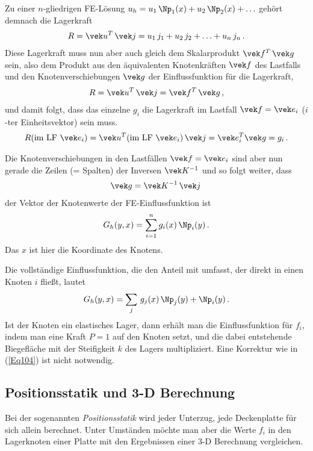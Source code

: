 {{{{{{Zu einer $n$-gliedrigen FE-L\"{o}sung $u_h = u_1\,\Np_1(x) + u_2\,\Np_2(x) + \ldots$ geh\"{o}rt demnach die Lagerkraft
\begin{align}
R = \vek u^T\,\vek j = u_1\,j_1 + u_2\,j_2 + \ldots + u_n\,j_n\,.
\end{align}
Diese Lagerkraft muss nun aber auch gleich dem Skalarprodukt $\vek f^T\,\vek g$ sein, also dem Produkt aus den \"{a}quivalenten Knotenkr\"{a}ften $\vek f$ des Lastfalls und den Knotenverschiebungen $\vek g$ der Einflussfunktion f\"{u}r die Lagerkraft,
\begin{align}
R = \vek u^T\,\vek j = \vek f^T\,\vek g\,,
\end{align}
und damit folgt, dass das einzelne $g_i$ die Lagerkraft im Lastfall $\vek f = \vek e_i$ ($i$-ter Einheitsvektor) sein muss.
\begin{align}
R (\text{im LF $\vek e_i$}) = \vek u^T (\text{im LF $\vek e_i$})\,\vek j = \vek e_i^T \vek g = g_i\,.
\end{align}

Die Knotenverschiebungen in den Lastf\"{a}llen $\vek f = \vek e_i$ sind aber nun gerade die Zeilen (= Spalten) der Inversen $\vek K^{-1}$ und so folgt weiter, dass
\begin{align}
\vek g = \vek K^{-1}\,\vek j\,
\end{align}
der Vektor der Knotenwerte der FE-Einflussfunktion ist
\begin{align}
G_h(y,x) = \sum_{i = 1}^n g_i(x)\,\Np_i(y)\,.
\end{align}
Das $ x$ ist hier die Koordinate des Knotens.

Die vollst\"{a}ndige Einflussfunktion, die den Anteil mit umfasst, der direkt in einen Knoten $i$ flie{\ss}t, lautet
\begin{align} \label{Eq104}
G_h(y,x) = \sum_j\,g_j(x)\,\Np_j(y) + \Np_i(y)\,.
\end{align}
Ist der Knoten ein elastisches Lager, dann erh\"{a}lt man die Einflussfunktion f\"{u}r $f_i$, indem man eine Kraft $P = 1$ auf den Knoten setzt, und die dabei entstehende Biegefl\"{a}che mit der Steifigkeit $k$ des Lagers multipliziert. Eine Korrektur wie in (\ref{Eq104}) ist nicht notwendig.

{\textcolor{blau2}{\section{Positionsstatik und 3-D Berechnung}}
Bei der sogenannten {\em Positionsstatik\/} wird jeder Unterzug, jede Deckenplatte f\"{u}r sich allein berechnet. Unter Umst\"{a}nden m\"{o}chte man aber die Werte $f_i$ in den Lagerknoten einer Platte mit den Ergebnissen einer 3-D Berechnung vergleichen.

}}}}}}}
